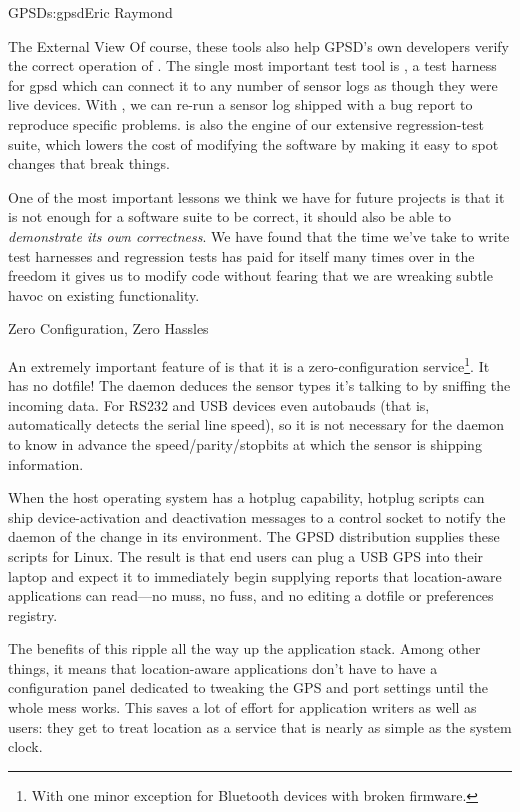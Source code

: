 \begin{aosachapter}{GPSD}{s:gpsd}{Eric Raymond}
\begin{aosasect1}{The External View}
Of course, these tools also help GPSD's own developers verify the
correct operation of . The single most important test tool
is , a test harness for gpsd which can connect it to any
number of sensor logs as though they were live devices.  With
, we can re-run a sensor log shipped with a bug report
to reproduce specific problems.   is also the engine of
our extensive regression-test suite, which lowers the cost of
modifying the software by making it easy to spot changes that break
things.

One of the most important lessons we think we have for future projects
is that it is not enough for a software suite to be correct, it should
also be able to \emph{demonstrate its own correctness}.  We have found
that the time we've take to write test harnesses and regression tests
has paid for itself many times over in the freedom it gives us to
modify code without fearing that we are wreaking subtle havoc on
existing functionality.

\end{aosasect1}

\begin{aosasect1}{Zero Configuration, Zero Hassles}

An extremely important feature of  is that it is a
zero-configuration service\footnote{With one minor exception for
Bluetooth devices with broken firmware.}.  It has no dotfile!  The
daemon deduces the sensor types it's talking to by sniffing the
incoming data.  For RS232 and USB devices  even autobauds
(that is, automatically detects the serial line speed), so it is not
necessary for the daemon to know in advance the speed/parity/stopbits
at which the sensor is shipping information.

When the host operating system has a hotplug capability, hotplug
scripts can ship device-activation and deactivation messages to a
control socket to notify the daemon of the change in its environment.
The GPSD distribution supplies these scripts for Linux.  The result
is that end users can plug a USB GPS into their laptop and expect
it to immediately begin supplying reports that location-aware
applications can read---no muss, no fuss, and no editing a 
dotfile or preferences registry.

The benefits of this ripple all the way up the application stack.
Among other things, it means that location-aware applications don't
have to have a configuration panel dedicated to tweaking the GPS and
port settings until the whole mess works. This saves a lot of effort
for application writers as well as users: they get to treat location
as a service that is nearly as simple as the system clock.


\end{aosasect1}
\end{aosachapter}
